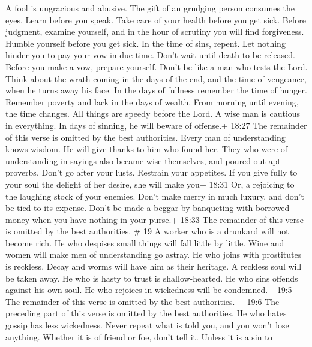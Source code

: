 A fool is ungracious and abusive. The gift of an grudging person
consumes the eyes.  Learn before you speak. Take care of
your health before you get sick.  Before judgment, examine
yourself, and in the hour of scrutiny you will find forgiveness.
 Humble yourself before you get sick. In the time of sins,
repent.  Let nothing hinder you to pay your vow in due
time. Don't wait until death to be released.  Before you
make a vow, prepare yourself. Don't be like a man who tests the Lord.
 Think about the wrath coming in the days of the end, and
the time of vengeance, when he turns away his face.  In the
days of fullness remember the time of hunger. Remember poverty and lack
in the days of wealth.  From morning until evening, the
time changes. All things are speedy before the Lord.  A
wise man is cautious in everything. In days of sinning, he will beware
of offense.+ 18:27 The remainder of this verse is omitted by the best
authorities.  Every man of understanding knows wisdom. He
will give thanks to him who found her.  They who were of
understanding in sayings also became wise themselves, and poured out apt
proverbs.  Don't go after your lusts. Restrain your
appetites.  If you give fully to your soul the delight of
her desire, she will make you+ 18:31 Or, a rejoicing to the laughing
stock of your enemies.  Don't make merry in much luxury,
and don't be tied to its expense.  Don't be made a beggar
by banqueting with borrowed money when you have nothing in your purse.+
18:33 The remainder of this verse is omitted by the best authorities. \#
19  A worker who is a drunkard will not become rich. He who
despises small things will fall little by little.  Wine and
women will make men of understanding go astray. He who joins with
prostitutes is reckless.  Decay and worms will have him as
their heritage. A reckless soul will be taken away.  He who
is hasty to trust is shallow-hearted. He who sins offends against his
own soul.  He who rejoices in wickedness will be condemned.+
19:5 The remainder of this verse is omitted by the best authorities.
 + 19:6 The preceding part of this verse is omitted by the
best authorities. He who hates gossip has less wickedness. 
Never repeat what is told you, and you won't lose anything. 
Whether it is of friend or foe, don't tell it. Unless it is a sin to
